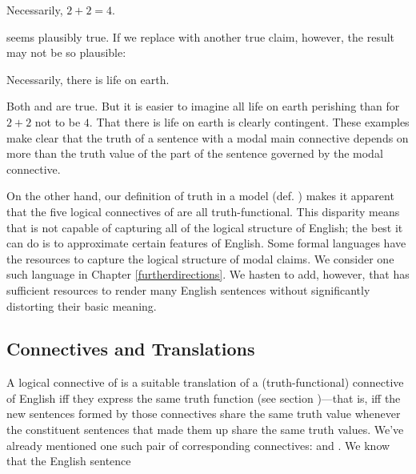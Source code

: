 \begin{menumerate}
	\item Necessarily, $2+2=4$.
\end{menumerate}

\noindent{}seems plausibly true.  If we replace  with another true claim, however, the result may not be so plausible:

\begin{menumerate}
	\item Necessarily, there is life on earth.
\end{menumerate}

\noindent{}Both  and  are true. But it is easier to imagine all life on earth perishing than for $2+2$ not to be $4$. That there is life on earth is clearly contingent. These examples make clear that the truth of a sentence with a modal main connective depends on more than the truth value of the part of the sentence governed by the modal connective.  

On the other hand, our definition of truth in a model (def. ) makes it apparent that the five logical connectives of \GSL{} are all truth-functional.  This disparity means that \GSL{} is not capable of capturing all of the logical structure of English; the best it can do is to approximate certain features of English.  Some formal languages have the resources to capture the logical structure of modal claims.  We consider one such language in Chapter \ref{furtherdirections}.  We hasten to add, however, that \GSL{} has sufficient resources to render many English sentences without significantly distorting their basic meaning.

\subsection{Connectives and Translations}\label{GSLConnectives and Trans}

A logical connective of \GSL{} is a suitable translation of a (truth-functional) connective of English iff they express the same truth function (see section )---that is, iff the new sentences formed by those connectives share the same truth value whenever the constituent sentences that made them up share the same truth values.  We've already mentioned one such pair of corresponding connectives:  and \mention{$\WEDGE$}.  We know that the English sentence

